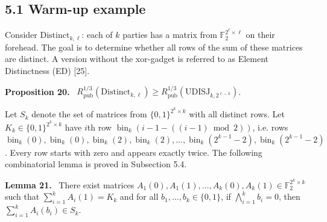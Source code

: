 \documentclass[10pt,a4paper]{article}
\newenvironment{authorclaim}[1]{\par\medskip\noindent\textbf{#1.}\ \ignorespaces}{\par\medskip}
\begin{document}
\subsection*{5.1 Warm-up example}
Consider $\mathrm{Distinct}_{k,\ell}$: each of $k$ parties has a matrix from $\mathbb F_2^{2^\ell\times\ell}$ on their forehead. The goal is to determine whether all rows of the sum of these matrices are distinct. A version without the xor-gadget is referred to as Element Distinctness (ED) [25].
\begin{authorclaim}{Proposition 20}
$R^{1/3}_{\mathrm{pub}}(\mathrm{Distinct}_{k,\ell})\ge R^{1/3}_{\mathrm{pub}}(\mathrm{UDISJ}_{k,2^{\ell-k}})$.
\end{authorclaim}
Let $S_k$ denote the set of matrices from $\{0,1\}^{2^k\times k}$ with all distinct rows. Let $K_k\in\{0,1\}^{2^k\times k}$ have $i$th row $\operatorname{bin}_k(i-1-((i-1)\bmod2))$, i.e. rows $\operatorname{bin}_k(0),\operatorname{bin}_k(0),\operatorname{bin}_k(2),\operatorname{bin}_k(2),\ldots,\operatorname{bin}_k(2^{k-1}-2),\operatorname{bin}_k(2^{k-1}-2)$. Every row starts with zero and appears exactly twice.
The following combinatorial lemma is proved in Subsection 5.4.
\begin{authorclaim}{Lemma 21}
There exist matrices $A_1(0),A_1(1),\ldots,A_k(0),A_k(1)\in\mathbb F_2^{2^k\times k}$ such that $\sum_{i=1}^kA_i(1)=K_k$ and for all $b_1,\ldots,b_k\in\{0,1\}$, if $\bigwedge_{i=1}^kb_i=0$, then $\sum_{i=1}^kA_i(b_i)\in S_k$.
\end{authorclaim}
\end{document}

